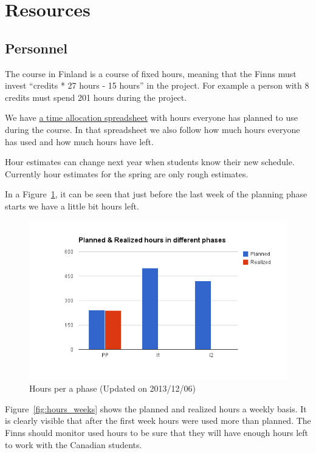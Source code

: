 \section{Resources}
\subsection{Personnel}

The course in Finland is a course of fixed hours, meaning that the
Finns must invest ``credits * 27 hours - 15 hours'' in the project. For example
a person with 8 credits must spend 201 hours during the project.

We have \href{https://docs.google.com/spreadsheet/ccc?key=0Ahu59q_GwtcedHI3MnJQM0NWZS11a
GxFTzFZeVEyQVE&usp=sharing}{a time allocation spreadsheet} with hours everyone
has planned to use during the course. In that spreadsheet we also follow how
much hours everyone has used and how much hours have left.

Hour estimates can change next year when students know their new schedule.
Currently hour estimates for the spring are only rough estimates.

In a Figure~\ref{fig:hours_phases}, it can be seen that just before the last
week of the planning phase starts we have a little bit hours left. 

\begin{figure}[H]
\centering
\includegraphics[width=1\textwidth]{imgs/chart_1.png}
\caption{Hours per a phase (Updated on 2013/12/06)}
\label{fig:hours_phases}
\end{figure}

Figure~\ref{fig:hours_weeks} shows the planned and realized hours a weekly
basis. It is clearly visible that after the first week hours were used more than
planned. The Finns should monitor used hours to be sure that they will have
enough hours left to work with the Canadian students.

